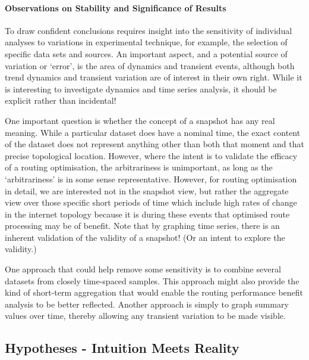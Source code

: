 \paragraph{Observations on Stability and Significance of Results}

To draw confident conclusions requires insight into the sensitivity of individual analyses to variations in experimental technique, for example, the selection of specific data sets and sources. An important aspect, and a potential source of variation or `error', is the area of dynamics and transient events, although both trend dynamics and transient variation are of interest in their own right. While it is interesting to investigate dynamics and time series analysis, it should be explicit rather than incidental!

One important question is whether the concept of a snapshot has any real meaning. While a particular dataset does have a nominal time, the exact content of the dataset does not represent anything other than both that moment and that precise topological location. However, where the intent is to validate the efficacy of a routing optimisation, the arbitrariness is unimportant, as long as the `arbitrariness' is in some sense representative. However, for routing optimisation in detail, we are interested not in the snapshot view, but rather the aggregate view over those specific short periods of time which include high rates of change in the internet topology because it is during these events that optimised route processing may be of benefit. Note that by graphing time series, there is an inherent validation of the validity of a snapshot! (Or an intent to explore the validity.)

One approach that could help remove some sensitivity is to combine several datasets from closely time-spaced samples. This approach might also provide the kind of short-term aggregation that would enable the routing performance benefit analysis to be better reflected. Another approach is simply to graph summary values over time, thereby allowing any transient variation to be made visible.

\subsection{Hypotheses - Intuition Meets Reality}

